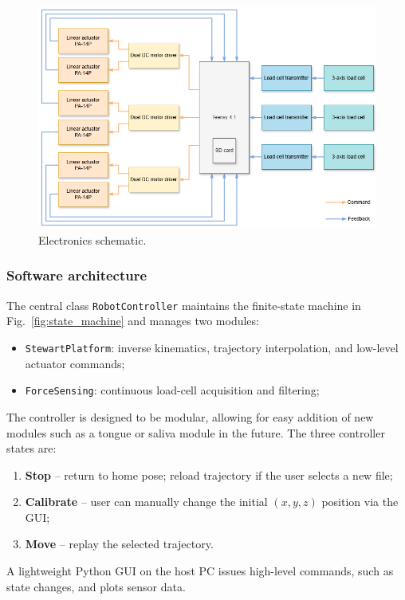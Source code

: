 \begin{figure}[H]
\centering
\includegraphics[width=\textwidth]{figures/elec_schematic.drawio.png}
\caption{Electronics schematic.}
\label{fig:elec_schematic}
\end{figure}

\subsubsection{Software architecture}
The central class \texttt{RobotController} maintains the finite-state machine in Fig.~\ref{fig:state_machine} and manages two
 modules:  
\begin{itemize}[nosep]
    \item \texttt{StewartPlatform}: inverse kinematics, trajectory interpolation, and low-level actuator commands;
    \item \texttt{ForceSensing}: continuous load-cell acquisition and filtering;
\end{itemize}
The controller is designed to be modular, allowing for easy addition of new modules such as a tongue or saliva module in the future.
The three controller states are:
\begin{enumerate}
    \item \textbf{Stop} – return to home pose; reload trajectory if the user selects a new file;
    \item \textbf{Calibrate} – user can manually change the initial $(x,y,z)$ position via the GUI;
    \item \textbf{Move} – replay the selected trajectory.
\end{enumerate}
A lightweight Python GUI on the host PC issues high-level commands, such as state changes, and plots sensor data.  

